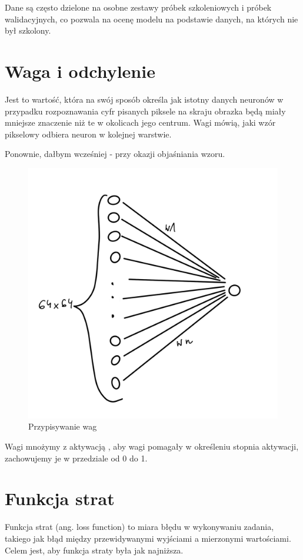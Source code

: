 \documentclass[brudnopis]{xmgr}
\begin{document}
Dane są często dzielone na osobne zestawy próbek szkoleniowych i próbek walidacyjnych, co pozwala na ocenę modelu na podstawie danych, na których nie był szkolony.


\section{Waga i odchylenie \label{s:dsssl}}
Jest to wartość, która na swój sposób określa jak istotny danych neuronów w przypadku rozpoznawania cyfr pisanych piksele na skraju obrazka będą miały mniejsze znaczenie niż te w okolicach jego centrum. Wagi mówią, jaki wzór pikselowy odbiera neuron w kolejnej warstwie.

Ponownie, dałbym wcześniej - przy okazji objaśniania wzoru.

\begin{figure}[!tbh]
\centering
\includegraphics[width=.8\hsize]{fig/3}
\caption{Przypisywanie wag\label{RYS.3}}
\end{figure}


 Wagi mnożymy z aktywacją ,  aby wagi pomagały w określeniu stopnia aktywacji, zachowujemy je w przedziale od 0 do 1.
 
 \section{Funkcja strat \label{s:dsssl}}
Funkcja strat (ang. loss function) to miara błędu w wykonywaniu zadania, takiego jak błąd między przewidywanymi wyjściami a mierzonymi wartościami. Celem jest, aby funkcja straty była jak najniższa.
 
\end{document}
